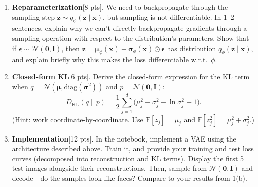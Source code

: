 \documentclass[submit]{harvardml}
\newcommand{\E}{\mathbb{E}}
\newcommand{\KL}{D_{\mathrm{KL}}}
\newcommand{\bx}{\mathbf{x}}
\newcommand{\bz}{\mathbf{z}}
\begin{document}
\begin{problem}
\begin{enumerate}
\begin{enumerate}

\item \textbf{Reparameterization}[8 pts]. We need to backpropagate through the sampling step $\bz \sim q_\phi(\bz \mid \bx)$, but sampling is not differentiable.
 In 1--2 sentences, explain why we can't directly backpropagate gradients through a sampling operation with respect to the distribution's parameters.
  Show that if $\bm{\epsilon} \sim \mathcal{N}(\bm{0}, \mathbf{I})$, then $\bz = \bm{\mu}_\phi(\bx) + \bm{\sigma}_\phi(\bx) \odot \bm{\epsilon}$ has distribution $q_\phi(\bz \mid \bx)$, and explain briefly why this makes the loss differentiable w.r.t.\ $\phi$.

\item \textbf{Closed-form KL}[6 pts]. Derive the closed-form expression for the KL term when $q = \mathcal{N}(\bm{\mu}, \mathrm{diag}(\bm{\sigma}^2))$ and $p = \mathcal{N}(\bm{0}, \mathbf{I})$:
\[
  \KL(q \| p) = \frac{1}{2}\sum_{j=1}^{d}\Big(\mu_j^2 + \sigma_j^2 - \ln \sigma_j^2 - 1\Big).
\]
(Hint: work coordinate-by-coordinate. Use $\E[z_j] = \mu_j$ and $\E[z_j^2] = \mu_j^2 + \sigma_j^2$.)

\item \textbf{Implementation}[12 pts]. In the notebook, implement a VAE using the architecture described above. Train it, and provide your training and test loss curves (decomposed into reconstruction and KL terms). Display the first 5 test images alongside their reconstructions. Then, sample from $\mathcal{N}(\bm{0}, \mathbf{I})$ and decode---do the samples look like faces? Compare to your results from 1(b).

\end{enumerate}
\end{enumerate}
\end{problem}
\end{document}
